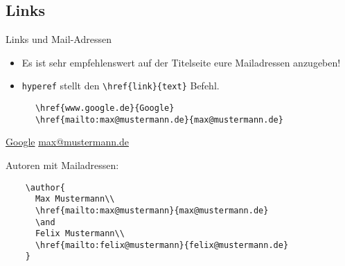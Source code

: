 \subsection{Links}
\begin{frame}[fragile]{Links und Mail-Adressen}
  \begin{itemize}
    \item Es ist sehr empfehlenswert auf der Titelseite eure Mailadressen anzugeben!
    \item \texttt{hyperef} stellt den \lstinline+\href{link}{text}+ Befehl.
  \end{itemize}
  \begin{CodeExample}{0.7}
    \begin{lstlisting}
      \href{www.google.de}{Google}
      \href{mailto:max@mustermann.de}{max@mustermann.de}
    \end{lstlisting}
    \CodeResult
    \href{www.google.de}{Google}
    \href{mailto:max@mustermann.de}{max@mustermann.de}
  \end{CodeExample}
  \begin{tblock}{Autoren mit Mailadressen:}
    \begin{lstlisting}
    \author{
      Max Mustermann\\
      \href{mailto:max@mustermann}{max@mustermann.de}
      \and
      Felix Mustermann\\
      \href{mailto:felix@mustermann}{felix@mustermann.de}
    }
    \end{lstlisting}
  \end{tblock}
\end{frame}
